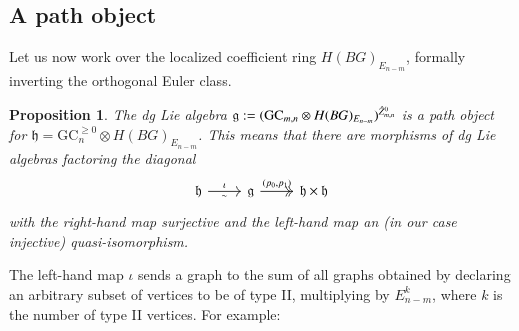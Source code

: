\documentclass[a4paper]{amsart}
\theoremstyle{plain}
\newtheorem{prop}[thm]{Proposition}
\theoremstyle{definition}
\newcommand{\alg}[1]{\mathfrak{{#1}}}
\newcommand{\fGCc}{\GC^{\geq 0}}
\newcommand{\GC}{\mathrm{GC}}
\begin{document}
\subsection{A path object}
Let us now work over the localized coefficient ring $H(BG)_{E_{n-m}}$, formally inverting the orthogonal Euler class.
\begin{prop}\label{prop:pathobject}
The dg Lie algebra $\alg g:=(\GC_{m,n} \otimes H(BG)_{E_{n-m}})^{\hZ_{m,n}^0}$ is a path object for $\alg h=\fGCc_n \otimes H(BG)_{E_{n-m}}$.
This means that there are morphisms of dg Lie algebras factoring the diagonal
\[
\begin{tikzcd}
\alg h \ar{r}{\iota}[swap]{\sim} & \alg g 
\ar[two heads]{r}{(p_0,p_1)}& \alg h \times \alg h
\end{tikzcd}
\]
with the right-hand map surjective and the left-hand map an (in our case injective) quasi-isomorphism.
\end{prop}
The left-hand map $\iota$ sends a graph to the sum of all graphs obtained by declaring an arbitrary subset of vertices to be of type II, multiplying by $E_{n-m}^k$, where $k$ is the number of type II vertices. For example:
\end{document}
